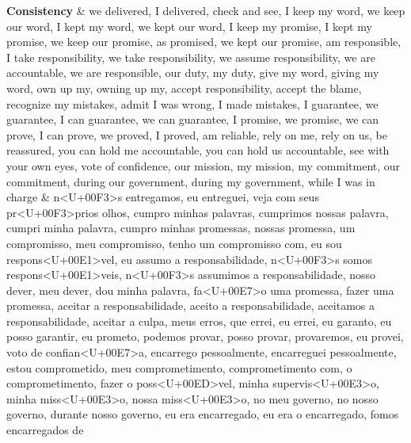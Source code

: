\documentclass[
  12pt,
]{article}
\begin{document}
\begin{landscape}
\begin{longtabu}
\textbf{Consistency} & we delivered, I delivered, check and see, I keep my word, we keep our word, I kept my word, we kept our word, I keep my promise, I kept my promise, we keep our promise, as promised, we kept our promise, am responsible, I take responsibility, we take responsibility, we assume responsibility, we are accountable, we are responsible, our duty, my duty, give my word, giving my word, own up my, owning up my, accept responsibility, accept the blame, recognize my mistakes, admit I was wrong, I made mistakes, I guarantee, we guarantee, I can guarantee, we can guarantee, I promise, we promise, we can prove, I can prove, we proved, I proved, am reliable, rely on me, rely on us, be reassured, you can hold me accountable, you can hold us accountable, see with your own eyes, vote of confidence, our mission, my mission, my commitment, our commitment, during our government, during my government, while I was in charge & n<U+00F3>s entregamos, eu entreguei, veja com seus pr<U+00F3>prios olhos, cumpro minhas palavras, cumprimos nossas palavra, cumpri minha palavra, cumpro minhas promessas, nossas promessa, um compromisso, meu compromisso, tenho um compromisso com, eu sou respons<U+00E1>vel, eu assumo a responsabilidade, n<U+00F3>s somos respons<U+00E1>veis, n<U+00F3>s assumimos a responsabilidade, nosso dever, meu dever, dou minha palavra, fa<U+00E7>o uma promessa, fazer uma promessa, aceitar a responsabilidade, aceito a responsabilidade, aceitamos a responsabilidade, aceitar a culpa, meus erros, que errei, eu errei, eu garanto, eu posso garantir, eu prometo, podemos provar, posso provar, provaremos, eu provei, voto de confian<U+00E7>a, encarrego pessoalmente, encarreguei pessoalmente, estou comprometido, meu comprometimento, comprometimento com, o comprometimento, fazer o poss<U+00ED>vel, minha supervis<U+00E3>o, minha miss<U+00E3>o, nossa miss<U+00E3>o, no meu governo, no nosso governo, durante nosso governo, eu era encarregado, eu era o encarregado, fomos encarregados de\\

\end{longtabu}
\end{landscape}
\end{document}
